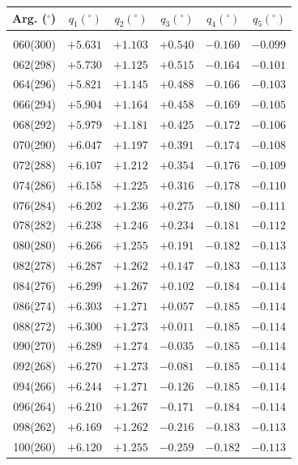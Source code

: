 \clearpage
\begin{table}[!h]
\vspace{0.25cm}
\centering
\begin{tabular}{rrrrrr}
Arg. ($^\circ$) & $q_1(^\circ)$  & $q_2(^\circ)$ & $q_3(^\circ)$ & $q_4(^\circ)$  & $q_5(^\circ)$  \\\hline
&&&&&\\[-1.75ex]
060(300) & $+5.631$ & $+1.103$ & $+0.540$ & $-0.160$ & $-0.099$ \\
062(298) & $+5.730$ & $+1.125$ & $+0.515$ & $-0.164$ & $-0.101$ \\ 
064(296) & $+5.821$ & $+1.145$ & $+0.488$ & $-0.166$ & $-0.103$ \\
066(294) & $+5.904$ & $+1.164$ & $+0.458$ & $-0.169$ & $-0.105$ \\ 
068(292) & $+5.979$ & $+1.181$ & $+0.425$ & $-0.172$ & $-0.106$ \\ 
070(290) & $+6.047$ & $+1.197$ & $+0.391$ & $-0.174$ & $-0.108$ \\ 
072(288) & $+6.107$ & $+1.212$ & $+0.354$ & $-0.176$ & $-0.109$ \\ 
074(286) & $+6.158$ & $+1.225$ & $+0.316$ & $-0.178$ & $-0.110$ \\ 
076(284) & $+6.202$ & $+1.236$ & $+0.275$ & $-0.180$ & $-0.111$ \\ 
078(282) & $+6.238$ & $+1.246$ & $+0.234$ & $-0.181$ & $-0.112$ \\ 
080(280) & $+6.266$ & $+1.255$ & $+0.191$ & $-0.182$ & $-0.113$ \\ 
082(278) & $+6.287$ & $+1.262$ & $+0.147$ & $-0.183$ & $-0.113$ \\ 
084(276) & $+6.299$ & $+1.267$ & $+0.102$ & $-0.184$ & $-0.114$ \\ 
086(274) & $+6.303$ & $+1.271$ & $+0.057$ & $-0.185$ & $-0.114$ \\ 
088(272) & $+6.300$ & $+1.273$ & $+0.011$ & $-0.185$ & $-0.114$ \\ 
090(270) & $+6.289$ & $+1.274$ & $-0.035$ & $-0.185$ & $-0.114$ \\ 
092(268) & $+6.270$ & $+1.273$ & $-0.081$ & $-0.185$ & $-0.114$\\
094(266) & $+6.244$ & $+1.271$ & $-0.126$ & $-0.185$ & $-0.114$\\
096(264) & $+6.210$ & $+1.267$ & $-0.171$ & $-0.184$ & $-0.114$\\
098(262) & $+6.169$ & $+1.262$ & $-0.216$ & $-0.183$ & $-0.113$\\
100(260) & $+6.120$ & $+1.255$ & $-0.259$ & $-0.182$ & $-0.113$\\

\end{tabular}
\end{table}

